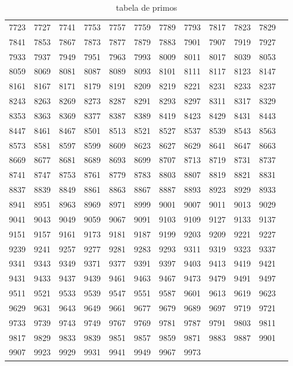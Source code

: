 \begin{table}
\begin{tabular}{llllllllllll}
7723 & 7727 & 7741 & 7753 & 7757 & 7759 & 7789 & 7793 & 7817 & 7823 & 7829 \\ 
7841 & 7853 & 7867 & 7873 & 7877 & 7879 & 7883 & 7901 & 7907 & 7919 & 7927 \\ 
7933 & 7937 & 7949 & 7951 & 7963 & 7993 & 8009 & 8011 & 8017 & 8039 & 8053 \\ 
8059 & 8069 & 8081 & 8087 & 8089 & 8093 & 8101 & 8111 & 8117 & 8123 & 8147 \\ 
8161 & 8167 & 8171 & 8179 & 8191 & 8209 & 8219 & 8221 & 8231 & 8233 & 8237 \\ 
8243 & 8263 & 8269 & 8273 & 8287 & 8291 & 8293 & 8297 & 8311 & 8317 & 8329 \\ 
8353 & 8363 & 8369 & 8377 & 8387 & 8389 & 8419 & 8423 & 8429 & 8431 & 8443 \\
8447 & 8461 & 8467 & 8501 & 8513 & 8521 & 8527 & 8537 & 8539 & 8543 & 8563 \\ 
8573 & 8581 & 8597 & 8599 & 8609 & 8623 & 8627 & 8629 & 8641 & 8647 & 8663 \\ 
8669 & 8677 & 8681 & 8689 & 8693 & 8699 & 8707 & 8713 & 8719 & 8731 & 8737 \\ 
8741 & 8747 & 8753 & 8761 & 8779 & 8783 & 8803 & 8807 & 8819 & 8821 & 8831 \\ 
8837 & 8839 & 8849 & 8861 & 8863 & 8867 & 8887 & 8893 & 8923 & 8929 & 8933 \\ 
8941 & 8951 & 8963 & 8969 & 8971 & 8999 & 9001 & 9007 & 9011 & 9013 & 9029 \\ 
9041 & 9043 & 9049 & 9059 & 9067 & 9091 & 9103 & 9109 & 9127 & 9133 & 9137 \\ 
9151 & 9157 & 9161 & 9173 & 9181 & 9187 & 9199 & 9203 & 9209 & 9221 & 9227 \\ 
9239 & 9241 & 9257 & 9277 & 9281 & 9283 & 9293 & 9311 & 9319 & 9323 & 9337 \\ 
9341 & 9343 & 9349 & 9371 & 9377 & 9391 & 9397 & 9403 & 9413 & 9419 & 9421 \\ 
9431 & 9433 & 9437 & 9439 & 9461 & 9463 & 9467 & 9473 & 9479 & 9491 & 9497 \\ 
9511 & 9521 & 9533 & 9539 & 9547 & 9551 & 9587 & 9601 & 9613 & 9619 & 9623 \\ 
9629 & 9631 & 9643 & 9649 & 9661 & 9677 & 9679 & 9689 & 9697 & 9719 & 9721 \\ 
9733 & 9739 & 9743 & 9749 & 9767 & 9769 & 9781 & 9787 & 9791 & 9803 & 9811 \\ 
9817 & 9829 & 9833 & 9839 & 9851 & 9857 & 9859 & 9871 & 9883 & 9887 & 9901 \\ 
9907 & 9923 & 9929 & 9931 & 9941 & 9949 & 9967 & 9973 & & & \\
\end{tabular}
\caption{tabela de primos}
\label{pimesTable}
\end{table}
